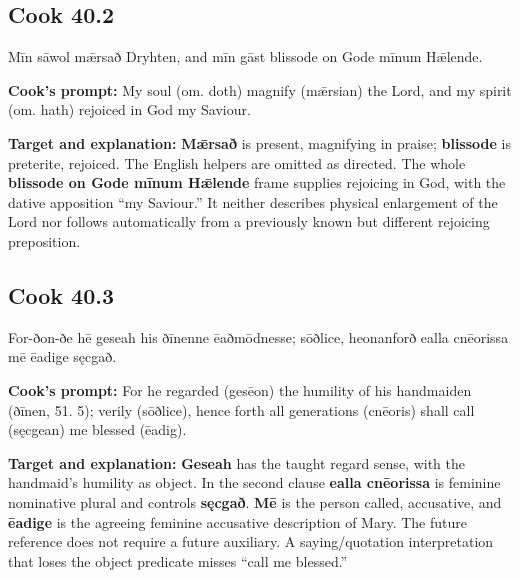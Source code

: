 \par\begin{minipage}{\linewidth}\raggedright
\subsection*{Cook 40.2}

Mīn sāwol mǣrsað Dryhten, and mīn gāst blissode on Gode mīnum Hǣlende.

\textbf{Cook's prompt:} My soul (om. doth) magnify (mǣrsian) the Lord, and my spirit (om. hath) rejoiced in God my Saviour.

\textbf{Target and explanation:} \textbf{Mǣrsað} is present, magnifying in praise; \textbf{blissode} is preterite, rejoiced. The English helpers are omitted as directed. The whole \textbf{blissode on Gode mīnum Hǣlende} frame supplies rejoicing in God, with the dative apposition “my Saviour.” It neither describes physical enlargement of the Lord nor follows automatically from a previously known but different rejoicing preposition.

\end{minipage}\par\addvspace{4pt}

\par\begin{minipage}{\linewidth}\raggedright
\subsection*{Cook 40.3}

For-ðon-ðe hē geseah his ðīnenne ēaðmōdnesse; sōðlice, heonanforð ealla cnēorissa mē ēadige sęcgað.

\textbf{Cook's prompt:} For he regarded (gesēon) the humility of his handmaiden (ðīnen, 51. 5); verily (sōðlice), hence forth all generations (cnēoris) shall call (sęcgean) me blessed (ēadig).

\textbf{Target and explanation:} \textbf{Geseah} has the taught regard sense, with the handmaid's humility as object. In the second clause \textbf{ealla cnēorissa} is feminine nominative plural and controls \textbf{sęcgað}. \textbf{Mē} is the person called, accusative, and \textbf{ēadige} is the agreeing feminine accusative description of Mary. The future reference does not require a future auxiliary. A saying/\allowbreak{}quotation interpretation that loses the object predicate misses “call me blessed.”

\end{minipage}\par\addvspace{4pt}

